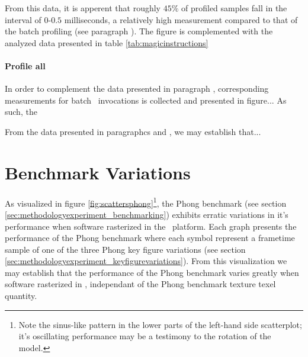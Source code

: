 

From this data, it is apperent that roughly $45\%$ of profiled samples fall in the interval of $0$-$0.5$ milliseconds, a relatively high measurement compared to that of the batch profiling (see paragraph ).
The figure is complemented with the analyzed data presented in table \ref{tab:magicinstructions}



\paragraph{Profile all}
\label{par:results_magicinstructionoverhead_profileall}
In order to complement the data presented in paragraph , corresponding measurements for batch \dvttermmagicinstruction\ invocations is collected and presented in figure...
As such, the 

\noindent
From the data presented in paragraphcs  and , we may establish that...

\section{Benchmark Variations}
\label{sec:results_benchmarkvariations}
As visualized in figure \ref{fig:scattersphong}\footnote{Note the sinus-like pattern in the lower parts of the left-hand side scatterplot; it's oscillating performance may be a testimony to the rotation of the model.}, the Phong benchmark (see section \ref{sec:methodologyexperiment_benchmarking}) exhibits erratic variations in it's performance when software rasterized in the \dvttermsimics\ platform.
Each graph presents the performance of the Phong benchmark where each symbol represent a frametime sample of one of the three Phong key figure variations (see section \ref{sec:methodologyexperiment_keyfigurevariations}).
From this visualization we may establish that the performance of the Phong benchmark varies greatly when software rasterized in \dvttermsimics , independant of the Phong benchmark texture texel quantity.

